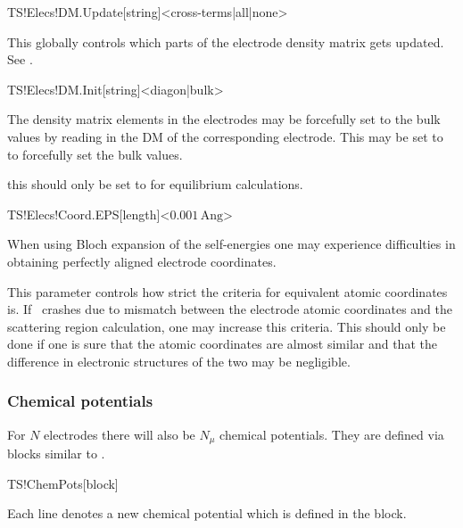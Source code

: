 \begin{fdfentry}{TS!Elecs!DM.Update}[string]<cross-terms|all|none>

  This globally controls which parts of the electrode density matrix
  gets updated. 
  See .
  
\end{fdfentry}

\begin{fdfentry}{TS!Elecs!DM.Init}[string]<diagon|bulk>

  The density matrix elements in the electrodes may be forcefully set
  to the bulk values by reading in the DM of the corresponding
  electrode. This may be set to  to forcefully set the bulk
  values.

  \note this should only be set to  for equilibrium
  calculations. 
  
\end{fdfentry}

\begin{fdfentry}{TS!Elecs!Coord.EPS}[length]<$0.001\,\mathrm{Ang}$>

  When using Bloch expansion of the self-energies one may experience
  difficulties in obtaining perfectly aligned electrode coordinates.

  This parameter controls how strict the criteria for equivalent
  atomic coordinates is. If \tsiesta\ crashes due to mismatch between
  the electrode atomic coordinates and the scattering region
  calculation, one may increase this criteria. This should only be
  done if one is sure that the atomic coordinates are almost similar
  and that the difference in electronic structures of the two may be
  negligible.
  
\end{fdfentry}


\subsubsection{Chemical potentials}
\label{sec:ts:chem-pot}

For $N$ electrodes there will also be $N_\mu$ chemical
potentials. They are defined via blocks similar to .

\begin{fdfentry}{TS!ChemPots}[block]
  
  Each line denotes a new chemical potential which is defined in the
   block.
  
\end{fdfentry}

